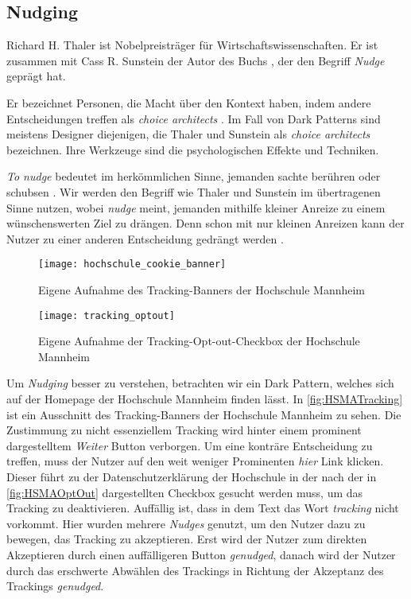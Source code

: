 \documentclass[conference,compsoc,final,a4paper]{IEEEtran}
\begin{document}
\subsection{Nudging}
Richard H. Thaler ist Nobelpreisträger für Wirtschaftswissenschaften. Er ist zusammen mit Cass R. Sunstein der Autor des Buchs  \autocite{Thaler2008}, der den Begriff \textit{Nudge} geprägt hat.

Er bezeichnet Personen, die Macht über den Kontext haben, indem andere Entscheidungen treffen als \textit{choice architects} \autocite[S. 3]{Thaler2008}. Im Fall von Dark Patterns sind meistens Designer diejenigen, die Thaler und Sunstein als \textit{choice architects} bezeichnen. Ihre Werkzeuge sind die psychologischen Effekte und Techniken.

\textit{To nudge} bedeutet im herkömmlichen Sinne, jemanden sachte berühren oder schubsen \autocite{MerriamWebsterNudge}. Wir werden den Begriff wie Thaler und Sunstein im übertragenen Sinne nutzen, wobei \textit{nudge} meint, jemanden mithilfe kleiner Anreize zu einem wünschenswerten Ziel zu drängen. Denn schon mit nur kleinen Anreizen kann der Nutzer zu einer anderen Entscheidung gedrängt werden \autocite{Narayanan2020}.

\begin{figure}[!ht]
  \centering
  \texttt{[image: hochschule\_cookie\_banner]}
  \caption{Eigene Aufnahme des Tracking-Banners der Hochschule Mannheim~\autocite{HSMAWebsite2021}}
  \label{fig:HSMATracking}
\end{figure}

\begin{figure}[!ht]
  \centering
  \texttt{[image: tracking\_optout]}
  \caption{Eigene Aufnahme der Tracking-Opt-out-Checkbox der Hochschule Mannheim~\autocite{HSMAWebsite2021}}
  \label{fig:HSMAOptOut}
\end{figure}

Um \textit{Nudging} besser zu verstehen, betrachten wir ein Dark Pattern, welches sich auf der Homepage der Hochschule Mannheim finden lässt. In \autoref{fig:HSMATracking} ist ein Ausschnitt des Tracking-Banners der Hochschule Mannheim zu sehen. Die Zustimmung zu nicht essenziellem Tracking wird hinter einem prominent dargestelltem \textit{Weiter} Button verborgen. Um eine konträre Entscheidung zu treffen, muss der Nutzer auf den weit weniger Prominenten \textit{hier} Link klicken. Dieser führt zu der Datenschutzerklärung der Hochschule in der nach der in \autoref{fig:HSMAOptOut} dargestellten Checkbox gesucht werden muss, um das Tracking zu deaktivieren. Auffällig ist, dass in dem Text das Wort \textit{tracking} nicht vorkommt. Hier wurden mehrere \textit{Nudges} genutzt, um den Nutzer dazu zu bewegen, das Tracking zu akzeptieren. Erst wird der Nutzer zum direkten Akzeptieren durch einen auffälligeren Button \textit{genudged}, danach wird der Nutzer durch das erschwerte Abwählen des Trackings in Richtung der Akzeptanz des Trackings \textit{genudged}.
\end{document}
